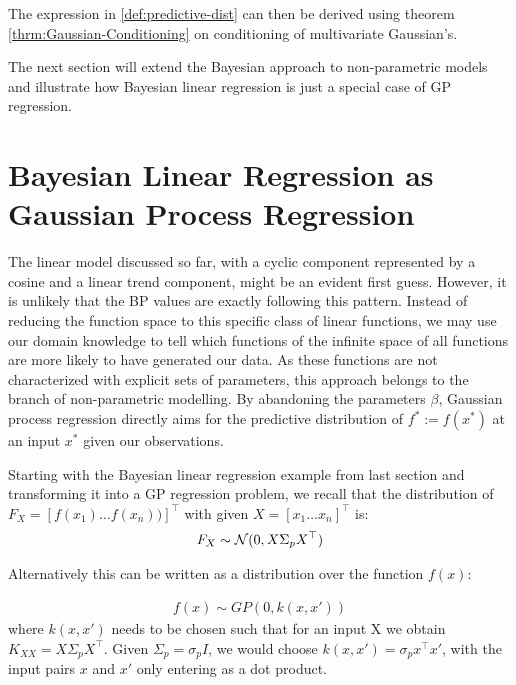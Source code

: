 The expression in \ref{def:predictive-dist} can then be derived using theorem \ref{thrm:Gaussian-Conditioning} on
conditioning of multivariate Gaussian's.

The next section will extend the Bayesian approach to non-parametric models and illustrate how Bayesian linear
regression is just a special case of GP regression.

\section{Bayesian Linear Regression as Gaussian Process Regression}\label{sec:gaussian-process-regression}
The linear model discussed so far, with a cyclic component represented by a cosine and a linear trend component,
might be an evident first guess.
However, it is unlikely that the BP values are exactly following this pattern.
Instead of reducing the function space to this specific class of linear functions, we may use our domain knowledge
to tell which functions of the infinite space of all functions are more likely to have generated our data.
As these functions are not characterized with explicit sets of
parameters, this approach belongs to the branch of non-parametric modelling.
By abandoning the parameters $\beta$, Gaussian process regression
directly aims for the predictive distribution of $f^{\ast} := f(x^{\ast})$ at an input $x^{\ast}$ given our observations.

Starting with the Bayesian linear regression example from last section and transforming it into a GP regression
problem, we recall that the distribution of $F_X = [f(x_1) \dots f(x_n))]^{\top}$ with given $X = [x_1 \dots x_n]^{\top}$ is:
\begin{gather*}
    F_X \sim \operatorname{\mathcal{N}}(0,  X \Sigma_p X^{\top})
\end{gather*}

Alternatively this can be written as a distribution over the function $f(x)$:

\begin{gather*}
    f(x) \sim GP(0, k(x, x'))
\end{gather*}
where $k(x,x')$ needs to be chosen such that for an input X we obtain $K_{XX} =  X \Sigma_p X^{\top}$.
Given $\Sigma_p = \sigma_p I$, we would choose $k(x,x') = \sigma_p x^{\top} x'$, with the
input pairs $x$ and $x'$ only entering as a dot product.




